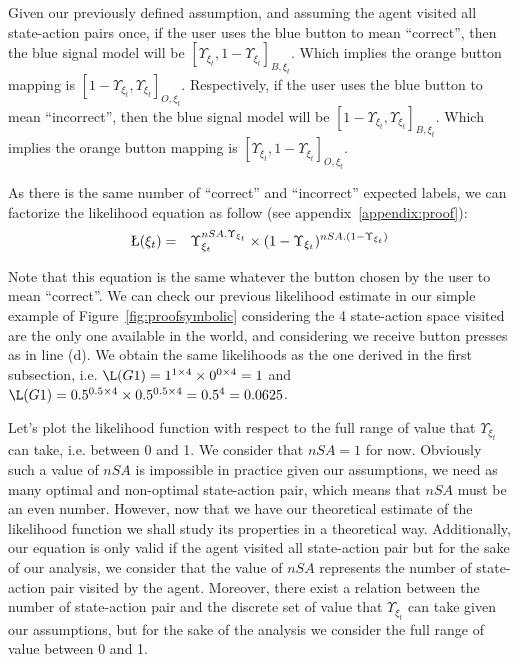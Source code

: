 Given our previously defined assumption, and assuming the agent visited all state-action pairs once, if the user uses the blue button to mean ``correct'', then the blue signal model will be $[\Upsilon_{\xi_t},1-\Upsilon_{\xi_t}]_{B,\xi_t}$. Which implies the orange button mapping is $[1-\Upsilon_{\xi_t},\Upsilon_{\xi_t}]_{O,\xi_t}$. Respectively, if the user uses the blue button to mean ``incorrect'', then the blue signal model will be $[1-\Upsilon_{\xi_t},\Upsilon_{\xi_t}]_{B,\xi_t}$. Which implies the orange button mapping is $[\Upsilon_{\xi_t},1-\Upsilon_{\xi_t}]_{O,\xi_t}$. 

As there is the same number of ``correct'' and ``incorrect'' expected labels, we can factorize the likelihood equation as follow (see appendix~\ref{appendix:proof}):
%
\begin{eqnarray}
\L(\xi_t) &=& \Upsilon_{\xi_t}^{nSA.\Upsilon_{\xi_t}} \times (1-\Upsilon_{\xi_t})^{nSA.(1-\Upsilon_{\xi_t})}
\label{eq:likelihoodproof}
\end{eqnarray}

Note that this equation is the same whatever the button chosen by the user to mean ``correct''. We can check our previous likelihood estimate in our simple example of Figure~\ref{fig:proofsymbolic} considering the 4 state-action space visited are the only one available in the world, and considering we receive button presses as in line (d). We obtain the same likelihoods as the one derived in the first subsection, i.e. $\L(G1) = 1^{1\times4} \times 0^{0\times4} = 1$ and $\L(G1) = 0.5^{0.5\times4} \times 0.5^{0.5\times4} = 0.5^4 = 0.0625$.

Let's plot the likelihood function with respect to the full range of value that $\Upsilon_{\xi_t}$ can take, i.e. between 0 and 1. We consider that $nSA = 1$ for now. Obviously such a value of $nSA$ is impossible in practice given our assumptions, we need as many optimal and non-optimal state-action pair, which means that $nSA$ must be an even number. However, now that we have our theoretical estimate of the likelihood function we shall study its properties in a theoretical way. Additionally, our equation is only valid if the agent visited all state-action pair but for the sake of our analysis, we consider that the value of $nSA$ represents the number of state-action pair visited by the agent. Moreover, there exist a relation between the number of state-action pair and the discrete set of value that $\Upsilon_{\xi_t}$ can take given our assumptions, but for the sake of the analysis we consider the full range of value between 0 and 1.

